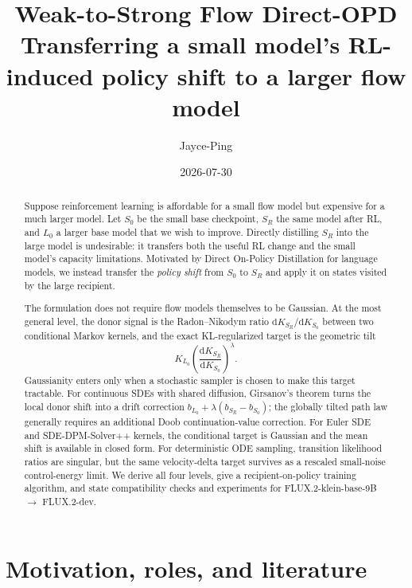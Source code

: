 \documentclass[11pt,a4paper]{article}
\title{\textbf{Weak-to-Strong Flow Direct-OPD}\\[0.3em]
\large Transferring a small model's RL-induced policy shift to a larger flow model}
\author{Jayce-Ping}
\date{2026-07-30}
\newcommand{\dd}{\mathrm{d}}
\newcommand{\Sbase}{S_0}
\newcommand{\Srl}{S_R}
\newcommand{\Lbase}{L_0}
\theoremstyle{plain}
\theoremstyle{definition}
\begin{document}
\maketitle

\begin{abstract}
Suppose reinforcement learning is affordable for a small flow model but expensive for a much
larger model.  Let $\Sbase$ be the small base checkpoint, $\Srl$ the same model after RL, and
$\Lbase$ a larger base model that we wish to improve.  Directly distilling $\Srl$ into the large
model is undesirable: it transfers both the useful RL change and the small model's capacity
limitations.  Motivated by Direct On-Policy Distillation for language models, we instead transfer
the \emph{policy shift} from $\Sbase$ to $\Srl$ and apply it on states visited by the large
recipient.

The formulation does not require flow models themselves to be Gaussian.  At the most general
level, the donor signal is the Radon--Nikodym ratio
$\dd K_{\Srl}/\dd K_{\Sbase}$ between two conditional Markov kernels, and the exact
KL-regularized target is the geometric tilt
\[
K_{\Lbase}
\left(\frac{\dd K_{\Srl}}{\dd K_{\Sbase}}\right)^\lambda.
\]
Gaussianity enters only when a stochastic sampler is chosen to make this target tractable.  For
continuous SDEs with shared diffusion, Girsanov's theorem turns the local donor shift into a drift
correction $b_{\Lbase}+\lambda(b_{\Srl}-b_{\Sbase})$; the globally tilted path law generally
requires an additional Doob continuation-value correction.  For Euler SDE and SDE-DPM-Solver++
kernels, the conditional target is Gaussian and the mean shift is available in closed form.
For deterministic ODE sampling, transition likelihood ratios are singular, but the same
velocity-delta target survives as a rescaled small-noise control-energy limit.  We derive all
four levels, give a recipient-on-policy training algorithm, and state compatibility checks and
experiments for FLUX.2-klein-base-9B $\rightarrow$ FLUX.2-dev.
\end{abstract}

\tableofcontents
\newpage

\section{Motivation, roles, and literature}
\label{sec:motivation}
\end{document}
